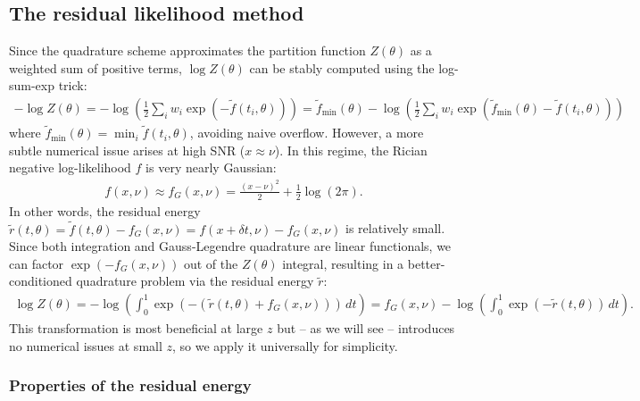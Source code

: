 \documentclass{article}
\begin{document}
\subsection{The residual likelihood method}

Since the quadrature scheme approximates the partition function $Z(\theta)$ as a weighted sum of positive terms, $\log Z(\theta)$ can be stably computed using the log-sum-exp trick:
%
\begin{align}
  -\log Z(\theta)
  = -\log\left(\frac{1}{2} \sum_i w_i \exp(-\tilde{f}(t_i, \theta))\right)
  = \tilde{f}_{\min}(\theta) - \log\left(\frac{1}{2} \sum_i w_i \exp(\tilde{f}_{\min}(\theta) - \tilde{f}(t_i, \theta))\right)
\end{align}
%
where $\tilde{f}_{\min}(\theta) = \min_i \tilde{f}(t_i, \theta)$, avoiding naive overflow.
However, a more subtle numerical issue arises at high SNR ($x \approx \nu$).
In this regime, the Rician negative log-likelihood $f$ is very nearly Gaussian:
%
\begin{align}
  f(x, \nu) \approx f_G(x,\nu) = \frac{(x-\nu)^2}{2} + \frac{1}{2}\log(2\pi).
\end{align}
%
In other words, the residual energy $\tilde{r}(t,\theta) = \tilde{f}(t,\theta) - f_G(x,\nu) = f(x + \delta t, \nu) - f_G(x,\nu)$ is relatively small.
Since both integration and Gauss-Legendre quadrature are linear functionals, we can factor $\exp(-f_G(x,\nu))$ out of the $Z(\theta)$ integral, resulting in a better-conditioned quadrature problem via the residual energy $\tilde{r}$:
%
\begin{align}
  \log Z(\theta)
  = - \log\left(\int_0^1 \exp(-(\tilde{r}(t,\theta) + f_G(x,\nu))) \, dt \right)
  = f_G(x,\nu) - \log\left(\int_0^1 \exp(-\tilde{r}(t,\theta)) \, dt \right).
\end{align}
%
This transformation is most beneficial at large $z$ but -- as we will see -- introduces no numerical issues at small $z$, so we apply it universally for simplicity.

\subsubsection{Properties of the residual energy}
\end{document}
